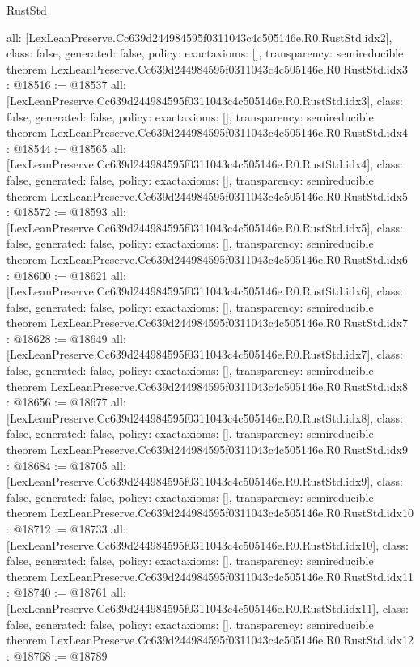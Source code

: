 \begin{lexlean}{RustStd}
\begin{coremodule}
{  all: [LexLeanPreserve.Cc639d244984595f0311043c4c505146e.R0.RustStd.idx2],
  class: false,
  generated: false,
  policy: exact{axioms: []},
  transparency: semireducible
}
theorem LexLeanPreserve.Cc639d244984595f0311043c4c505146e.R0.RustStd.idx3 : @18516 := @18537 {
  all: [LexLeanPreserve.Cc639d244984595f0311043c4c505146e.R0.RustStd.idx3],
  class: false,
  generated: false,
  policy: exact{axioms: []},
  transparency: semireducible
}
theorem LexLeanPreserve.Cc639d244984595f0311043c4c505146e.R0.RustStd.idx4 : @18544 := @18565 {
  all: [LexLeanPreserve.Cc639d244984595f0311043c4c505146e.R0.RustStd.idx4],
  class: false,
  generated: false,
  policy: exact{axioms: []},
  transparency: semireducible
}
theorem LexLeanPreserve.Cc639d244984595f0311043c4c505146e.R0.RustStd.idx5 : @18572 := @18593 {
  all: [LexLeanPreserve.Cc639d244984595f0311043c4c505146e.R0.RustStd.idx5],
  class: false,
  generated: false,
  policy: exact{axioms: []},
  transparency: semireducible
}
theorem LexLeanPreserve.Cc639d244984595f0311043c4c505146e.R0.RustStd.idx6 : @18600 := @18621 {
  all: [LexLeanPreserve.Cc639d244984595f0311043c4c505146e.R0.RustStd.idx6],
  class: false,
  generated: false,
  policy: exact{axioms: []},
  transparency: semireducible
}
theorem LexLeanPreserve.Cc639d244984595f0311043c4c505146e.R0.RustStd.idx7 : @18628 := @18649 {
  all: [LexLeanPreserve.Cc639d244984595f0311043c4c505146e.R0.RustStd.idx7],
  class: false,
  generated: false,
  policy: exact{axioms: []},
  transparency: semireducible
}
theorem LexLeanPreserve.Cc639d244984595f0311043c4c505146e.R0.RustStd.idx8 : @18656 := @18677 {
  all: [LexLeanPreserve.Cc639d244984595f0311043c4c505146e.R0.RustStd.idx8],
  class: false,
  generated: false,
  policy: exact{axioms: []},
  transparency: semireducible
}
theorem LexLeanPreserve.Cc639d244984595f0311043c4c505146e.R0.RustStd.idx9 : @18684 := @18705 {
  all: [LexLeanPreserve.Cc639d244984595f0311043c4c505146e.R0.RustStd.idx9],
  class: false,
  generated: false,
  policy: exact{axioms: []},
  transparency: semireducible
}
theorem LexLeanPreserve.Cc639d244984595f0311043c4c505146e.R0.RustStd.idx10 : @18712 := @18733 {
  all: [LexLeanPreserve.Cc639d244984595f0311043c4c505146e.R0.RustStd.idx10],
  class: false,
  generated: false,
  policy: exact{axioms: []},
  transparency: semireducible
}
theorem LexLeanPreserve.Cc639d244984595f0311043c4c505146e.R0.RustStd.idx11 : @18740 := @18761 {
  all: [LexLeanPreserve.Cc639d244984595f0311043c4c505146e.R0.RustStd.idx11],
  class: false,
  generated: false,
  policy: exact{axioms: []},
  transparency: semireducible
}
theorem LexLeanPreserve.Cc639d244984595f0311043c4c505146e.R0.RustStd.idx12 : @18768 := @18789 {
}
\end{coremodule}
\end{lexlean}
